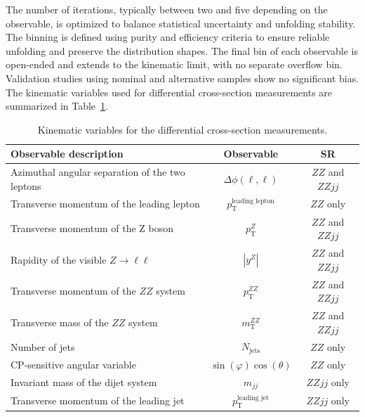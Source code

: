 The number of iterations, typically between two and five depending on the observable, is optimized to balance statistical uncertainty and unfolding stability. The binning is defined using purity and efficiency criteria to ensure reliable unfolding and preserve the distribution shapes. The final bin of each observable is open-ended and extends to the kinematic limit, with no separate overflow bin. Validation studies using nominal and alternative samples show no significant bias. 
The kinematic variables used for differential cross-section measurements are summarized in Table~\ref{tab:diff-var}.
\begin{table}[!hbtp]
    \centering
    \renewcommand{\arraystretch}{1.5}
    \begin{tabular}{l c c}
    \hline
  \textbf{Observable description} &  \textbf{Observable} &  \textbf{SR} \\
     \hline 
      Azimuthal angular separation of the two leptons & $\Delta\phi(\ell, \ell)$  & $ZZ$ and $ZZjj$ \\
      Transverse momentum of the leading lepton  &  $p_\text{T}^{\text{leading lepton}}$ & $ZZ$ only \\  
      Transverse momentum of the Z boson  & $p_\text{T}^Z$ & $ZZ$ and $ZZjj$ \\  
      Rapidity of the visible $Z \rightarrow \ell\ell$  &    $|y^Z|$ & $ZZ$ and $ZZjj$ \\ 
      Transverse momentum of the $ZZ$ system  &  $p_\text{T}^{ZZ}$ & $ZZ$ and $ZZjj$ \\ 
       Transverse mass of the $ZZ$ system 
       &  $m_\text{T}^{ZZ}$ & $ZZ$ and $ZZjj$\\
     Number of jets                   &   $N_\text{jets}$ & $ZZ$ only\\  
    CP-sensitive angular variable   &  $\sin(\varphi)\cos(\theta)$ & $ZZ$ only\\
    Invariant mass of the dijet system & $m_{jj}$ & $ZZjj$ only \\ 
    Transverse momentum of the leading jet & $p_\text{T}^{\text{leading jet}}$ & $ZZjj$ only \\ 
    \hline
    \end{tabular}
    \caption{\rm Kinematic variables for the differential cross-section measurements.} %
    \label{tab:diff-var}
\end{table} 


